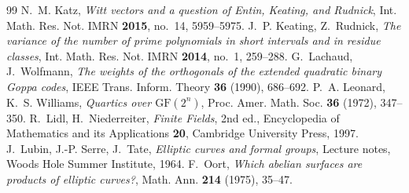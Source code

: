 \documentclass[12pt,a4paper]{amsart}
\theoremstyle{definition}
\begin{document}
\begin{thebibliography}{99}
 N.~M. Katz, \emph{Witt vectors and a question of Entin, Keating, and Rudnick}, Int. Math. Res. Not. IMRN \textbf{2015}, no.~14, 5959--5975.
 J.~P. Keating, Z.~Rudnick, \emph{The variance of the number of prime polynomials in short intervals and in residue classes}, Int. Math. Res. Not. IMRN \textbf{2014}, no.~1, 259--288.
 G.~Lachaud, J.~Wolfmann, \emph{The weights of the orthogonals of the extended quadratic binary Goppa codes}, IEEE Trans. Inform. Theory \textbf{36} (1990), 686--692.
 P.~A. Leonard, K.~S. Williams, \emph{Quartics over $\mathrm{GF}(2^n)$}, Proc. Amer. Math. Soc. \textbf{36} (1972), 347--350.
 R.~Lidl, H.~Niederreiter, \emph{Finite Fields}, 2nd ed., Encyclopedia of Mathematics and its Applications \textbf{20}, Cambridge University Press, 1997.
 J.~Lubin, J.-P. Serre, J.~Tate, \emph{Elliptic curves and formal groups}, Lecture notes, Woods Hole Summer Institute, 1964.
 F.~Oort, \emph{Which abelian surfaces are products of elliptic curves?}, Math. Ann. \textbf{214} (1975), 35--47.
\end{thebibliography}
\end{document}

